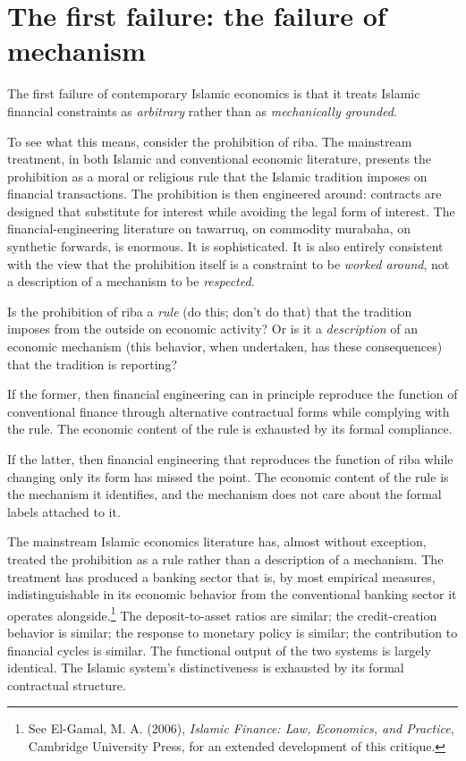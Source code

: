 \section{The first failure: the failure of mechanism}
\label{sec:first-failure}

The first failure of contemporary Islamic economics is that it
treats Islamic financial constraints as \emph{arbitrary} rather than
as \emph{mechanically grounded}.

To see what this means, consider the prohibition of riba. The
mainstream treatment, in both Islamic and conventional economic
literature, presents the prohibition as a moral or religious rule
that the Islamic tradition imposes on financial transactions. The
prohibition is then engineered around: contracts are designed that
substitute for interest while avoiding the legal form of interest.
The financial-engineering literature on tawarruq, on commodity
murabaha, on synthetic forwards, is enormous. It is sophisticated.
It is also entirely consistent with the view that the prohibition
itself is a constraint to be \emph{worked around}, not a description
of a mechanism to be \emph{respected}.

\begin{conceptbox}
Is the prohibition of riba a \emph{rule} (do this; don't do that)
that the tradition imposes from the outside on economic activity?
Or is it a \emph{description} of an economic mechanism (this
behavior, when undertaken, has these consequences) that the
tradition is reporting?

If the former, then financial engineering can in principle
reproduce the function of conventional finance through alternative
contractual forms while complying with the rule. The economic
content of the rule is exhausted by its formal compliance.

If the latter, then financial engineering that reproduces the
function of riba while changing only its form has missed the point.
The economic content of the rule is the mechanism it identifies, and
the mechanism does not care about the formal labels attached to it.
\end{conceptbox}

The mainstream Islamic economics literature has, almost without
exception, treated the prohibition as a rule rather than a
description of a mechanism. The treatment has produced a banking
sector that is, by most empirical measures, indistinguishable in its
economic behavior from the conventional banking sector it operates
alongside.\footnote{See El-Gamal, M. A. (2006), \emph{Islamic Finance:
Law, Economics, and Practice}, Cambridge University Press, for an
extended development of this critique.} The deposit-to-asset ratios
are similar; the credit-creation behavior is similar; the response
to monetary policy is similar; the contribution to financial cycles
is similar. The functional output of the two systems is largely
identical. The Islamic system's distinctiveness is exhausted by its
formal contractual structure.

